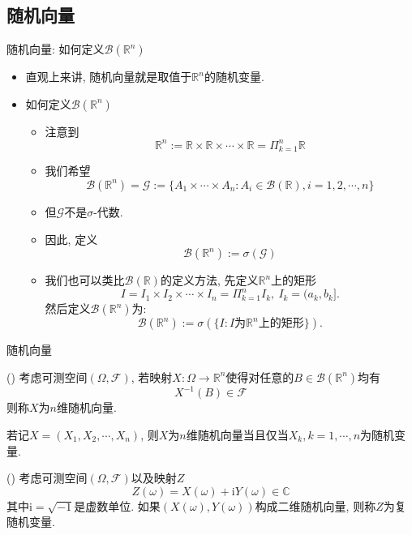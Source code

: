 \documentclass[Prob-All.tex]{subfiles}
\begin{document}
\subsection{随机向量}

\begin{frame}{随机向量: 如何定义$\mathcal{B}(\mathbb{R}^n)$}
\begin{itemize}
	\item 直观上来讲, 随机向量就是取值于$\mathbb{R}^n$的随机变量.
	\item 如何定义$\mathcal{B}(\mathbb{R}^n)$
	\begin{itemize}[<+-|alert@+>]
		\item 注意到$$\mathbb{R}^n:=\mathbb{R}\times \mathbb{R}\times\cdots\times \mathbb{R}=\Pi_{k=1}^n\mathbb{R}$$
		\item 我们希望
		\[\mathcal{B}(\mathbb{R}^n)=\mathcal{G}:=\{A_1\times\cdots\times A_n: A_i\in\mathcal{B}(\mathbb{R}),i=1,2,\cdots,n\}\]
		\item 但$\mathcal{G}$不是$\sigma$-代数.
		\item 因此, 定义
		\[\mathcal{B}(\mathbb{R}^n):=\sigma(\mathcal{G})\]
		\item 我们也可以类比$\mathcal{B}(\mathbb{R})$的定义方法, 先定义$\mathbb{R}^n$上的矩形
		$$I=I_1\times I_2\times\cdots\times I_n=\Pi_{k=1}^nI_k, \ I_k=(a_k, b_k].$$ 然后定义$\mathcal{B}(\mathbb{R}^n)$为:
		\[\mathcal{B}(\mathbb{R}^n):=\sigma(\{I:I\mbox{为}\mathbb{R}^n\mbox{上的矩形}\}).\]%
	\end{itemize}

\end{itemize}

\end{frame}

\begin{frame}{随机向量}
\begin{defi}
() 考虑可测空间$(\Omega,\mathcal{F})$, 若映射$X: \Omega \rightarrow \mathbb{R}^{n}$使得对任意的$B \in \mathcal{B}(\mathbb{R}^{n})$均有
	\[
	X^{-1}(B) \in \mathcal{F}
	\]
则称$X$为$n$维随机向量.
\end{defi}
\pause
\begin{rmk}
若记$X=(X_1, X_2,\cdots, X_n)$, 则$X$为$n$维随机向量当且仅当$X_k, k=1,\cdots,n$为随机变量.
\end{rmk}

\pause
\begin{defi}
() 考虑可测空间$(\Omega,\mathcal{F})$以及映射$Z$
\[
Z(\omega)=X(\omega)+\mathrm{i} Y(\omega) \in \mathbb{C}
\]
其中$\mathrm{i}=\sqrt{-1}$是虚数单位. 如果$(X(\omega), Y(\omega))$构成二维随机向量, 则称$Z$为复随机变量.
\end{defi}

\end{frame}
\end{document}
